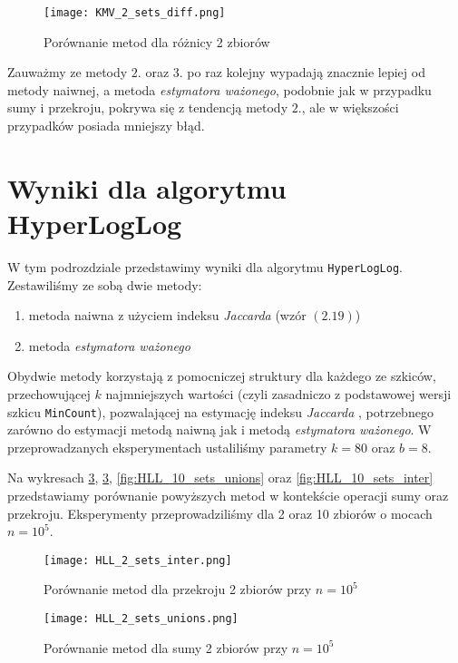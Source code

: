 \begin{figure}[h!]
    \texttt{[image: KMV\_2\_sets\_diff.png]}
    \centering
    \caption{Porównanie metod dla różnicy 2 zbiorów}
    \label{fig:KMV_2_sets_diff}
\end{figure}

Zauważmy ze metody $2.$ oraz $3.$ po raz kolejny wypadają znacznie lepiej od metody naiwnej, a metoda \textit{estymatora ważonego}, podobnie jak w przypadku sumy i przekroju, pokrywa się z tendencją metody $2.$, ale w większości przypadków posiada mniejszy błąd.

\newpage
\section{Wyniki dla algorytmu HyperLogLog}
W tym podrozdziale przedstawimy wyniki dla algorytmu \texttt{HyperLogLog}. Zestawiliśmy ze sobą dwie metody:
\begin{enumerate}
	\item metoda naiwna z użyciem indeksu \textit{Jaccarda} (wzór $(2.19)$)
	\item metoda \textit{estymatora ważonego}
\end{enumerate}
Obydwie metody korzystają z pomocniczej struktury dla każdego ze szkiców, przechowującej $k$ najmniejszych wartości (czyli zasadniczo z podstawowej wersji szkicu \texttt{MinCount}), pozwalającej na estymację indeksu \textit{Jaccarda} \cite{adroll}, potrzebnego zarówno do estymacji metodą naiwną jak i metodą \textit{estymatora ważonego}. W przeprowadzanych eksperymentach ustaliliśmy parametry $k = 80$ oraz $b = 8$.

Na wykresach \ref{fig:HLL_2_sets_unions}, \ref{fig:HLL_2_sets_unions}, \ref{fig:HLL_10_sets_unions} oraz \ref{fig:HLL_10_sets_inter} przedstawiamy porównanie powyższych metod w kontekście operacji sumy oraz przekroju. Eksperymenty przeprowadziliśmy dla 2 oraz 10 zbiorów o mocach $n=10^5$.

\begin{figure}[h!]
	\texttt{[image: HLL\_2\_sets\_inter.png]}
	\centering
	\caption{Porównanie metod dla przekroju 2 zbiorów przy $n=10^5$}
	\label{fig:HLL_2_sets_inter}
\end{figure}

\begin{figure}[h!]
	\texttt{[image: HLL\_2\_sets\_unions.png]}
	\centering
	\caption{Porównanie metod dla sumy 2 zbiorów przy $n=10^5$}
	\label{fig:HLL_2_sets_unions}
\end{figure}

